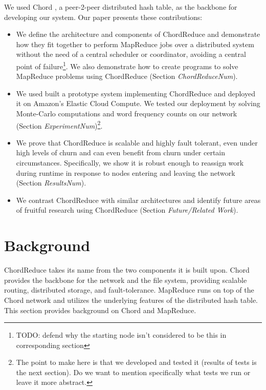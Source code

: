 \documentclass[10pt, conference, compsocconf]{IEEEtran}
\begin{document}
We used Chord \cite{Chord}, a peer-2-peer distributed hash table, as the backbone for developing our system.  Our paper presents these contributions:
\begin{itemize}
	\item We define the architecture and components of ChordReduce and demonstrate how they fit together to perform MapReduce jobs over a distributed system without the need of a central scheduler or coordinator, avoiding a central point of failure\footnote{TODO: defend why the starting node isn't considered to be this in corresponding section}. We also demonstrate how to create programs to solve MapReduce problems using ChordReduce (Section \textit{ChordReduceNum}). 
	\item We used built a prototype system implementing ChordReduce and deployed it on Amazon's Elastic Cloud Compute.  We tested our deployment by solving Monte-Carlo computations and word frequency counts on our network (Section \textit{ExperimentNum})\footnote{The point to make here is that we developed and tested it (results of tests is the next section).  Do we want to mention specifically what tests we run or leave it more abstract.}.
	\item We prove that ChordReduce is scalable and highly fault tolerant, even under high levels of churn and can even benefit from churn under certain circumstances. Specifically, we show it is robust enough to reassign work during runtime in response to nodes entering and leaving the network (Section \textit{ResultsNum}).
	\item We contrast ChordReduce with similar architectures and identify future areas of fruitful research using ChordReduce (Section \textit{Future/Related  Work}). 





\end{itemize}

\section{Background}
ChordReduce takes its name from the two components it is built upon.  Chord\cite{Chord} provides the backbone for the network and the file system, providing scalable routing, distributed storage, and fault-tolerance.   MapReduce runs on top of the Chord network and utilizes the underlying features of the distributed hash table.  This section provides background on Chord and MapReduce.
\end{document}
